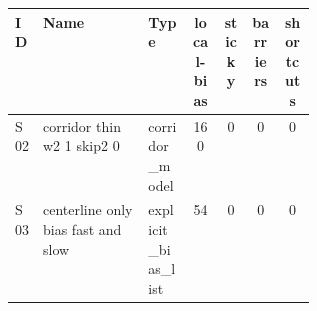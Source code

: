 \begin{tabular}{lp{0.35\linewidth}lcccc}
\toprule
ID & Name & Type & local-bias & sticky & barriers & shortcuts \\
\midrule
S02 & corridor thin w2 1 skip2 0 & corridor\_model & 160 & 0 & 0 & 0 \\
S03 & centerline only bias fast and slow & explicit\_bias\_list & 54 & 0 & 0 & 0 \\
\bottomrule
\end{tabular}